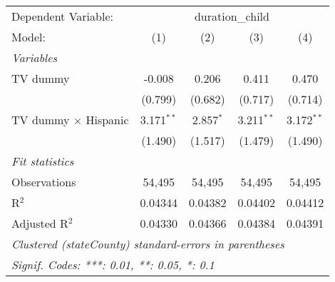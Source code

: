 \begin{tabular}{lcccc}
\tabularnewline\midrule\midrule
Dependent Variable:&\multicolumn{4}{c}{duration\_child}\\
Model:&(1) & (2) & (3) & (4)\\
\midrule \emph{Variables}&   &   &   &  \\
TV dummy & -0.008 & 0.206 & 0.411 & 0.470\\
  &(0.799) & (0.682) & (0.717) & (0.714)\\
TV dummy $\times$ Hispanic & 3.171$^{**}$ & 2.857$^{*}$ & 3.211$^{**}$ & 3.172$^{**}$\\
  &(1.490) & (1.517) & (1.479) & (1.490)\\
\midrule \emph{Fit statistics}&  & & & \\
Observations & 54,495&54,495&54,495&54,495\\
R$^2$ & 0.04344&0.04382&0.04402&0.04412\\
Adjusted R$^2$ & 0.04330&0.04366&0.04384&0.04391\\
\midrule\midrule\multicolumn{5}{l}{\emph{Clustered (stateCounty) standard-errors in parentheses}}\\
\multicolumn{5}{l}{\emph{Signif. Codes: ***: 0.01, **: 0.05, *: 0.1}}\\
\end{tabular}


